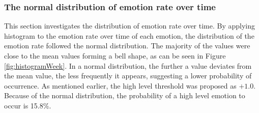 \subsubsection{The normal distribution of emotion rate over time}
This section investigates the distribution of emotion rate over time. By applying histogram to the emotion rate over time of each emotion, the distribution of the emotion rate followed the normal distribution. The majority of the values were close to the mean values forming a bell shape, as can be seen in Figure \ref{fig:histogramWeek}. In a normal distribution, the further a value deviates from the mean value, the less frequently it appears, suggesting a lower probability of occurrence. As mentioned earlier, the high level threshold was proposed as \(+1.0\). Because of the normal distribution, the probability of a high level emotion to occur is 15.8\%.

